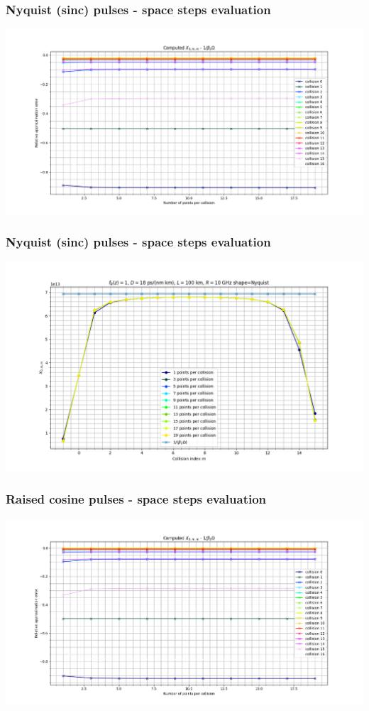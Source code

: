 \documentclass[8pt]{beamer} %
\begin{document}
\begin{frame}
	\frametitle{Nyquist (sinc) pulses - space steps evaluation}
	\includegraphics[width=\textwidth]{"./images/sim/spatial_collision_N.png"}
\end{frame}

\begin{frame}
	\frametitle{Nyquist (sinc) pulses - space steps evaluation}
	\includegraphics[width=\textwidth]{"./images/sim/spatial_N.png"}
\end{frame}

\begin{frame}
	\frametitle{Raised cosine pulses - space steps evaluation}
	\includegraphics[width=\textwidth]{"./images/sim/spatial_collision_RC.png"}
\end{frame}
\end{document}
